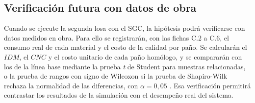 \subsection{Verificación futura con datos de obra}
\label{sec:verificacion-futura}

Cuando se ejecute la segunda losa con el SGC, la hipótesis podrá verificarse con datos medidos en obra. Para ello se registrarán, con las fichas C.2 a C.6, el consumo real de cada material y el costo de la calidad por paño. Se calcularán el $IDM$, el $CNC$ y el costo unitario de cada paño homólogo, y se compararán con los de la línea base mediante la prueba \emph{t} de Student para muestras relacionadas, o la prueba de rangos con signo de Wilcoxon si la prueba de Shapiro-Wilk rechaza la normalidad de las diferencias, con $\alpha = 0{,}05$ \parencite{hernandez2018}. Esa verificación permitirá contrastar los resultados de la simulación con el desempeño real del sistema.
